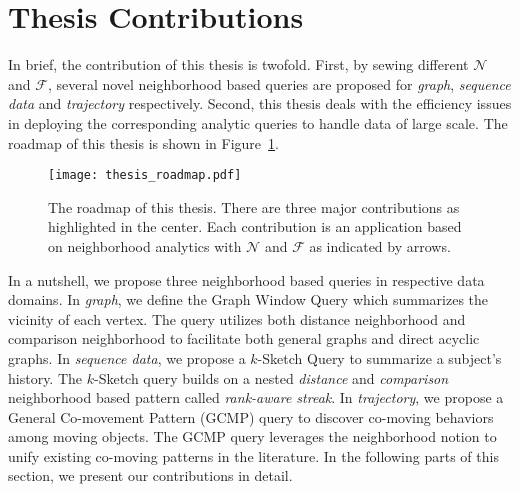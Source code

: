 \section{Thesis Contributions}
In brief, the contribution of this thesis is twofold.
First, by sewing different $\mathcal{N}$ and $\mathcal{F}$, 
several novel neighborhood based queries are proposed for 
\emph{graph}, \emph{sequence data} and \emph{trajectory} respectively. 
Second, this thesis
deals with the efficiency issues in deploying the corresponding analytic queries to
handle data of large scale.
The roadmap of this thesis is shown in Figure~\ref{fig:thesis_roadmap}.
\begin{figure}[h]
\centering
\texttt{[image: thesis\_roadmap.pdf]}
\caption{The roadmap of this thesis. There are three major contributions as highlighted in the center. Each contribution
is an application based on neighborhood analytics with $\mathcal{N}$ and $\mathcal{F}$ as indicated by arrows.} 
\label{fig:thesis_roadmap}
\end{figure}

In a nutshell, we propose three neighborhood based queries in respective data domains. 
In \emph{graph}, we define the Graph Window Query which summarizes the vicinity of each vertex.
The query utilizes both distance neighborhood and comparison neighborhood to facilitate both
general graphs and direct acyclic graphs.
%
In \emph{sequence data}, we propose a $k$-Sketch Query to summarize a subject's history. The $k$-Sketch query builds on a nested \emph{distance} and \emph{comparison} neighborhood based pattern called \emph{rank-aware streak}.
%
In \emph{trajectory}, we propose a General Co-movement Pattern (GCMP) query to discover co-moving behaviors among moving objects. The GCMP query leverages the neighborhood notion to unify existing co-moving patterns in the literature.
%
In the following parts of this section, we present our contributions in detail.


